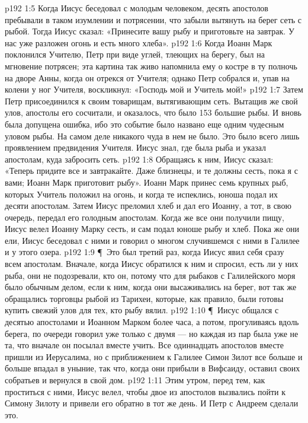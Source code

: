 \vs p192 1:5 Когда Иисус беседовал с молодым человеком, десять апостолов пребывали в таком изумлении и потрясении, что забыли вытянуть на берег сеть с рыбой. Тогда Иисус сказал: «Принесите вашу рыбу и приготовьте на завтрак. У нас уже разложен огонь и есть много хлеба».
\vs p192 1:6 Когда Иоанн Марк поклонился Учителю, Петр при виде углей, тлеющих на берегу, был на мгновение потрясен; эта картина так живо напомнила ему о костре в ту полночь на дворе Анны, когда он отрекся от Учителя; однако Петр собрался и, упав на колени у ног Учителя, воскликнул: «Господь мой и Учитель мой!»
\vs p192 1:7 Затем Петр присоединился к своим товарищам, вытягивающим сеть. Вытащив же свой улов, апостолы его сосчитали, и оказалось, что было 153 большие рыбы. И вновь была допущена ошибка, ибо это событие было названо еще одним чудесным уловом рыбы. На самом деле никакого чуда в нем не было. Это было всего лишь проявлением предвидения Учителя. Иисус знал, где была рыба и указал апостолам, куда забросить сеть.
\vs p192 1:8 Обращаясь к ним, Иисус сказал: «Теперь придите все и завтракайте. Даже близнецы, и те должны сесть, пока я с вами; Иоанн Марк приготовит рыбу». Иоанн Марк принес семь крупных рыб, которых Учитель положил на огонь, и когда те испеклись, юноша подал их десяти апостолам. Затем Иисус преломил хлеб и дал его Иоанну, а тот, в свою очередь, передал его голодным апостолам. Когда же все они получили пищу, Иисус велел Иоанну Марку сесть, и сам подал юноше рыбу и хлеб. Пока же они ели, Иисус беседовал с ними и говорил о многом случившемся с ними в Галилее и у этого озера.
\vs p192 1:9 \P\ Это был третий раз, когда Иисус явил себя сразу всем апостолам. Вначале, когда Иисус обратился к ним и спросил, есть ли у них рыба, они не подозревали, кто он, потому что для рыбаков с Галилейского моря было обычным делом, если к ним, когда они высаживались на берег, вот так же обращались торговцы рыбой из Тарихеи, которые, как правило, были готовы купить свежий улов для тех, кто рыбу вялил.
\vs p192 1:10 \P\ Иисус общался с десятью апостолами и Иоанном Марком более часа, а потом, прогуливаясь вдоль берега, по очереди говорил уже только с двумя --- но каждая из пар была уже не та, что вначале он посылал вместе учить. Все одиннадцать апостолов вместе пришли из Иерусалима, но с приближением к Галилее Симон Зилот все больше и больше впадал в уныние, так что, когда они прибыли в Вифсаиду, оставил своих собратьев и вернулся в свой дом.
\vs p192 1:11 Этим утром, перед тем, как проститься с ними, Иисус велел, чтобы двое из апостолов вызвались пойти к Симону Зилоту и привели его обратно в тот же день. И Петр с Андреем сделали это.
